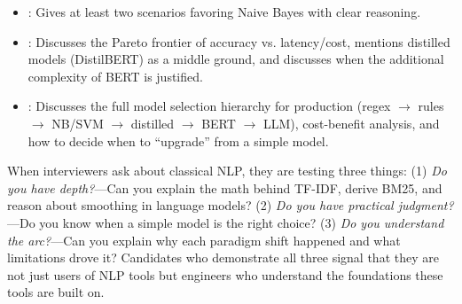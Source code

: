 \begin{interviewq}

\goodgreat
\begin{itemize}
    \item {}: Gives at least two scenarios favoring Naive Bayes with clear
    reasoning.
    \item {}: Discusses the Pareto frontier of accuracy vs. latency/cost,
    mentions distilled models (DistilBERT) as a middle ground, and discusses when the
    additional complexity of BERT is justified.
    \item {}: Discusses the full model selection hierarchy for production
    (regex $\to$ rules $\to$ NB/SVM $\to$ distilled $\to$ BERT $\to$ LLM), cost-benefit
    analysis, and how to decide when to ``upgrade'' from a simple model.
\end{itemize}

\end{interviewq}

\bigskip

\begin{keyinsight}
When interviewers ask about classical NLP, they are testing three things: (1) \emph{Do you
have depth?}---Can you explain the math behind TF-IDF, derive BM25, and reason about
smoothing in language models? (2) \emph{Do you have practical judgment?}---Do you know when
a simple model is the right choice? (3) \emph{Do you understand the arc?}---Can you explain
why each paradigm shift happened and what limitations drove it? Candidates who demonstrate
all three signal that they are not just users of NLP tools but engineers who understand the
foundations these tools are built on.
\end{keyinsight}
